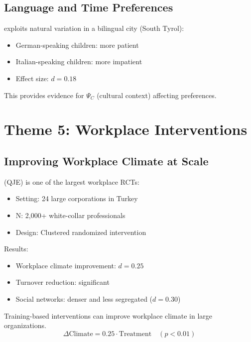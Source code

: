 \subsection{Language and Time Preferences}

\citet{sutter2018language} exploits natural variation in a bilingual city (South Tyrol):
\begin{itemize}
\item German-speaking children: more patient
\item Italian-speaking children: more impatient
\item Effect size: $d = 0.18$
\end{itemize}

This provides evidence for $\Psi_C$ (cultural context) affecting preferences.


\section{Theme 5: Workplace Interventions}
\label{sec:su-workplace}

\subsection{Improving Workplace Climate at Scale}

\citet{alan2023workplace} (QJE) is one of the largest workplace RCTs:
\begin{itemize}
\item Setting: 24 large corporations in Turkey
\item N: 2,000+ white-collar professionals
\item Design: Clustered randomized intervention
\end{itemize}

Results:
\begin{itemize}
\item Workplace climate improvement: $d = 0.25$
\item Turnover reduction: significant
\item Social networks: denser and less segregated ($d = 0.30$)
\end{itemize}

\begin{tcolorbox}[colback=green!5!white, colframe=green!75!black,
    title=Key Result UNMAPPED_SU-6: Scalable Workplace Interventions]
Training-based interventions can improve workplace climate in large organizations.
\begin{equation}
\Delta \text{Climate} = 0.25 \cdot \text{Treatment} \quad (p < 0.01)
\end{equation}
\end{tcolorbox}

